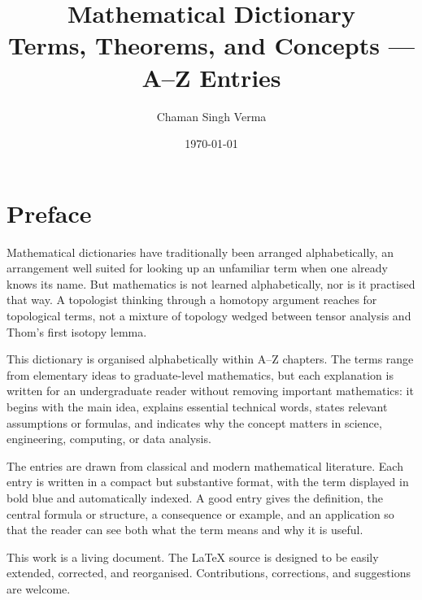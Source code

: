 \documentclass[11pt,twocolumn,twoside]{book}
\title{\textbf{\Huge Mathematical Dictionary}\\[0.5em]
\Large Terms, Theorems, and Concepts --- A--Z Entries}
\author{Chaman Singh Verma}
\date{\today}
\begin{document}
\onecolumn
\frontmatter
\maketitle
\newpage
\thispagestyle{empty}
\vspace*{\fill}


\vspace*{\fill}
\newpage

\thispagestyle{fancy}

\chapter*{Preface}

\noindent Mathematical dictionaries have traditionally been arranged alphabetically, an arrangement well suited for looking up an unfamiliar term when one already knows its name. But mathematics is not learned alphabetically, nor is it practised that way. A topologist thinking through a homotopy argument reaches for topological terms, not a mixture of topology wedged between tensor analysis and Thom's first isotopy lemma.

\medskip

\noindent This dictionary is organised alphabetically within A--Z chapters. The terms range from elementary ideas to graduate-level mathematics, but each explanation is written for an undergraduate reader without removing important mathematics: it begins with the main idea, explains essential technical words, states relevant assumptions or formulas, and indicates why the concept matters in science, engineering, computing, or data analysis.

\medskip

\noindent The entries are drawn from classical and modern mathematical literature. Each entry is written in a compact but substantive format, with the term displayed in bold blue and automatically indexed. A good entry gives the definition, the central formula or structure, a consequence or example, and an application so that the reader can see both what the term means and why it is useful.

\medskip

\noindent This work is a living document. The LaTeX source is designed to be easily extended, corrected, and reorganised. Contributions, corrections, and suggestions are welcome.
\end{document}
